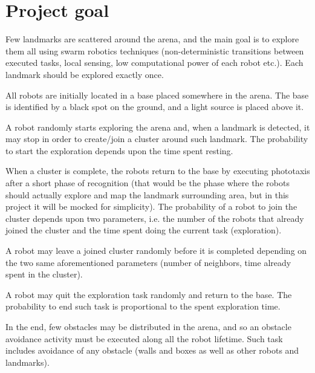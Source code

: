 \chapter{Project goal}

Few landmarks are scattered around the arena, and the main goal is to explore them all using swarm robotics techniques (non-deterministic transitions between executed tasks, local sensing, low computational power of each robot etc.). Each landmark should be explored exactly once.

\noindent
All robots are initially located in a base placed somewhere in the arena. The base is identified by a black spot on the ground, and a light source is placed above it.

\noindent
A robot randomly starts exploring the arena and, when a landmark is detected, it may stop in order to create/join a cluster around such landmark. The probability to start the exploration depends upon the time spent resting. 

\noindent
When a cluster is complete, the robots return to the base by executing phototaxis after a short phase of recognition (that would be the phase where the robots should actually explore and map the landmark surrounding area, but in this project it will be mocked for simplicity). The probability of a robot to join the cluster depends upon two parameters, i.e. the number of the robots that already joined the cluster and the time spent doing the current task (exploration).

\noindent
A robot may leave a joined cluster randomly before it is completed depending on the two same aforementioned parameters (number of neighbors, time already spent in the cluster).



\noindent
A robot may quit the exploration task randomly and return to the base. The probability to end such task is proportional to the spent exploration time. 

\noindent
In the end, few obstacles may be distributed in the arena, and so an obstacle avoidance activity must be executed along all the robot lifetime. Such task includes avoidance of any obstacle (walls and boxes as well as other robots and landmarks).        